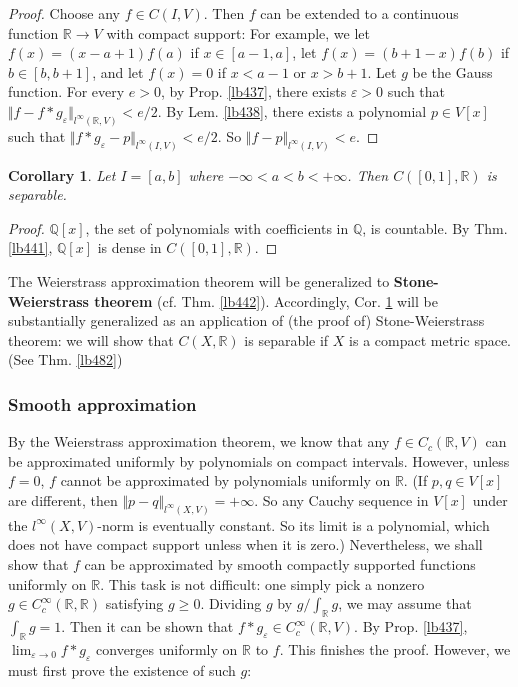 \documentclass[12pt,b5paper,notitlepage]{article}
\theoremstyle{definition}
\theoremstyle{plain}
\newtheorem{co}[df]{Corollary}
\newcommand{\Qbb}{\mathbb Q}
\newcommand{\Rbb}{\mathbb R}
\newcommand{\eps}{\varepsilon}
\numberwithin{equation}{section}
\begin{document}
\begin{proof}
Choose any $f\in C(I,V)$. Then $f$ can be extended to a continuous function $\Rbb\rightarrow V$ with compact support: For example, we let $f(x)=(x-a+1)f(a)$ if $x\in[a-1,a]$, let $f(x)=(b+1-x)f(b)$ if $b\in[b,b+1]$, and let $f(x)=0$ if $x<a-1$ or $x>b+1$. Let $g$ be the Gauss function. For every $e>0$, by Prop. \ref{lb437}, there exists $\eps>0$ such that $\Vert f-f*g_\eps\Vert_{l^\infty(\Rbb,V)}<e/2$. By Lem. \ref{lb438}, there exists a polynomial $p\in V[x]$ such that $\Vert f*g_\eps-p\Vert_{l^\infty(I,V)}<e/2$. So $\Vert f-p\Vert_{l^\infty(I,V)}<e$.
\end{proof}


\begin{co}\label{lb486}
Let $I=[a,b]$ where $-\infty<a<b<+\infty$. Then $C([0,1],\Rbb)$ is separable.
\end{co}

\begin{proof}
$\Qbb[x]$, the set of polynomials with coefficients in $\Qbb$, is countable. By Thm. \ref{lb441}, $\Qbb[x]$ is dense in $C([0,1],\Rbb)$.
\end{proof}

The Weierstrass approximation theorem will be generalized to \textbf{Stone-Weierstrass theorem} (cf. Thm. \ref{lb442}). Accordingly, Cor. \ref{lb486}  will be substantially generalized as an application of (the proof of) Stone-Weierstrass theorem: we will show that $C(X,\Rbb)$ is separable if $X$ is a compact metric space. (See Thm. \ref{lb482}) 



\subsubsection{Smooth approximation}

By the Weierstrass approximation theorem, we know that any $f\in C_c(\Rbb,V)$ can be approximated uniformly by polynomials on compact intervals. However, unless $f=0$, $f$ cannot be approximated by polynomials uniformly on $\Rbb$. (If $p,q\in V[x]$ are different, then $\Vert p-q\Vert_{l^\infty(X,V)}=+\infty$. So any Cauchy sequence in $V[x]$ under the ${l^\infty(X,V)}$-norm is eventually constant. So its limit is a polynomial, which does not have compact support unless when it is zero.) Nevertheless, we shall show that $f$ can be approximated by smooth compactly supported functions uniformly on $\Rbb$. This task is not difficult: one simply pick a nonzero $g\in C_c^\infty(\Rbb,\Rbb)$ satisfying $g\geq0$. Dividing $g$ by $g/\int_\Rbb g$, we may assume that $\int_\Rbb g=1$. Then it can be shown that $f*g_\eps\in C_c^\infty(\Rbb,V)$. By Prop. \ref{lb437}, $\lim_{\eps\rightarrow0}f*g_\eps$ converges uniformly on $\Rbb$ to $f$. This finishes the proof. However, we must first prove the existence of such $g$:
\end{document}
